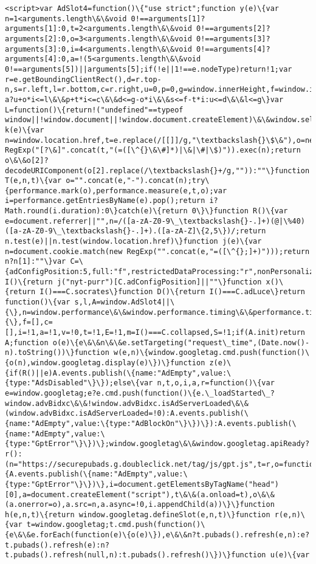 \documentclass[11pt]{article}
\begin{document}
\begin{Verbatim}[commandchars=\\\{\}]
         <script>var AdSlot4=function()\{"use strict";function y(e)\{var n=1<arguments.length\&\&void 0!==arguments[1]?arguments[1]:0,t=2<arguments.length\&\&void 0!==arguments[2]?arguments[2]:0,o=3<arguments.length\&\&void 0!==arguments[3]?arguments[3]:0,i=4<arguments.length\&\&void 0!==arguments[4]?arguments[4]:0,a=!(5<arguments.length\&\&void 0!==arguments[5])||arguments[5];if(!e||1!==e.nodeType)return!1;var r=e.getBoundingClientRect(),d=r.top-n,s=r.left,l=r.bottom,c=r.right,u=0,p=0,g=window.innerHeight,f=window.innerWidth;return a?u+o*i<=l\&\&p+t*i<=c\&\&d<=g-o*i\&\&s<=f-t*i:u<=d\&\&l<=g\}var L=function()\{return!("undefined"==typeof window||!window.document||!window.document.createElement)\&\&window.self!==window.top\};function k(e)\{var n=window.location.href,t=e.replace(/[[]]/g,"\textbackslash{}\$\&"),o=new RegExp("[?\&]".concat(t,"(=([\^{}\&\#]*)|\&|\#|\$)")).exec(n);return o\&\&o[2]?decodeURIComponent(o[2].replace(/\textbackslash{}+/g,"")):""\}function T(e,n,t)\{var o="".concat(e,"-").concat(n);try\{performance.mark(o),performance.measure(e,t,o);var i=performance.getEntriesByName(e).pop();return i?Math.round(i.duration):0\}catch(e)\{return 0\}\}function R()\{var e=document.referrer||"",n=/([a-zA-Z0-9\_\textbackslash{}-.]+)(@|\%40)([a-zA-Z0-9\_\textbackslash{}-.]+).([a-zA-Z]\{2,5\})/;return n.test(e)||n.test(window.location.href)\}function j(e)\{var n=document.cookie.match(new RegExp("".concat(e,"=([\^{};]+)")));return n?n[1]:""\}var C=\{adConfigPosition:5,full:"f",restrictedDataProcessing:"r",nonPersonalized:"n",collapsed:"c",adLuce:"a",socrates:"s"\};function I()\{return j("nyt-purr")[C.adConfigPosition]||""\}function x()\{return I()===C.socrates\}function D()\{return I()===C.adLuce\}return function()\{var s,l,A=window.AdSlot4||\{\},n=window.performance\&\&window.performance.timing\&\&performance.timing.responseStart,d=\{\},f=[],c=[],i=!1,a=!1,v=!0,t=!1,E=!1,m=I()===C.collapsed,S=!1;if(A.init)return A;function o(e)\{e\&\&n\&\&e.setTargeting("request\_time",(Date.now()-n).toString())\}function w(e,n)\{window.googletag.cmd.push(function()\{o(n),window.googletag.display(e)\})\}function z(e)\{if(R()||e)A.events.publish(\{name:"AdEmpty",value:\{type:"AdsDisabled"\}\});else\{var n,t,o,i,a,r=function()\{var e=window.googletag;e?e.cmd.push(function()\{e.\_loadStarted\_?window.advBidxc\&\&!window.advBidxc.isAdServerLoaded\&\&(window.advBidxc.isAdServerLoaded=!0):A.events.publish(\{name:"AdEmpty",value:\{type:"AdBlockOn"\}\})\}):A.events.publish(\{name:"AdEmpty",value:\{type:"GptError"\}\})\};window.googletag\&\&window.googletag.apiReady?r():(n="https://securepubads.g.doubleclick.net/tag/js/gpt.js",t=r,o=function()\{A.events.publish(\{name:"AdEmpty",value:\{type:"GptError"\}\})\},i=document.getElementsByTagName("head")[0],a=document.createElement("script"),t\&\&(a.onload=t),o\&\&(a.onerror=o),a.src=n,a.async=!0,i.appendChild(a))\}\}function h(e,n,t)\{return window.googletag.defineSlot(e,n,t)\}function r(e,n)\{var t=window.googletag;t.cmd.push(function()\{e\&\&e.forEach(function(e)\{o(e)\}),e\&\&n?t.pubads().refresh(e,n):e?t.pubads().refresh(e):n?t.pubads().refresh(null,n):t.pubads().refresh()\})\}function u(e)\{var 
\end{Verbatim}
\end{document}
